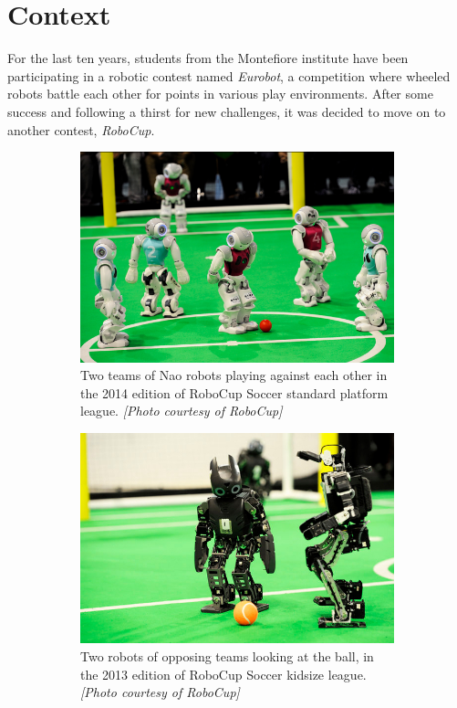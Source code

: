 \section{Context}
For the last ten years, students from the Montefiore institute have been participating in a robotic contest named \emph{Eurobot}, a competition where wheeled robots battle each other for points in various play environments. After some success and following a thirst for new challenges, it was decided to move on to another contest, \emph{RoboCup}.

\begin{figure}[htp]
\center
\begin{subfigure}[b]{0.45\textwidth}
\includegraphics[width=\textwidth]{figures/robocup}
\caption[Robocup Soccer standard platform]{Two teams of Nao robots playing against each other in the 2014 edition of RoboCup Soccer standard platform league. \textit{[Photo courtesy of RoboCup]}}
\label{fig:intro_robocup}
\end{subfigure}
\hfill
\begin{subfigure}[b]{0.45\textwidth}
\includegraphics[width=\textwidth]{figures/intro_ks}
\caption[Robocup Soccer standard platform]{Two robots of opposing teams looking at the ball, in the 2013 edition of RoboCup Soccer kidsize league. \textit{[Photo courtesy of RoboCup]}}
\label{fig:intro_ks}
\end{subfigure}
\caption{}
\label{fig:}
\end{figure}


